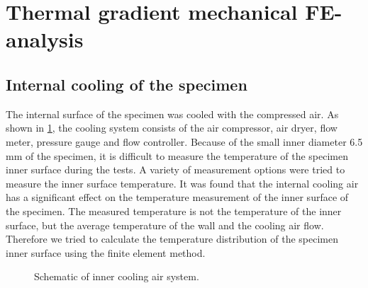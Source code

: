 \section{Thermal gradient mechanical FE-analysis}

\subsection{Internal cooling of the specimen}
\noindent
The internal surface of the specimen was cooled with the compressed air. As shown in \ref{Fig:inner_cooling}, the cooling system consists of the air compressor, air dryer, flow meter, pressure gauge and flow controller.
Because of the small inner diameter 6.5 mm of the specimen, it is difficult to measure the temperature of the specimen inner surface during the tests.
A variety of measurement options were tried to measure the inner surface temperature.
It was found that the internal cooling air has a significant effect on the temperature measurement of the inner surface of the specimen.
The measured temperature is not the temperature of the inner surface, but the average temperature of the wall and the cooling air flow.
Therefore we tried to calculate the temperature distribution of the specimen inner surface using the finite element method.

\begin{figure}[!htp]
\caption{Schematic of inner cooling air system.}
\label{Fig:inner_cooling}
\end{figure}

